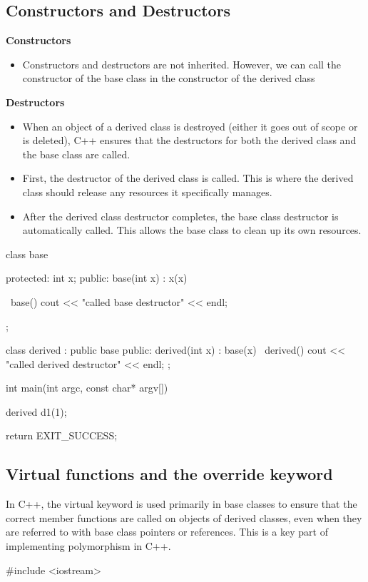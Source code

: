 \documentclass{report}
\begin{document}
\begin{concept}
    \pagebreak
    \subsection{Constructors and Destructors}
    \bigbreak \noindent 
    \begin{concept}
        \bigbreak \noindent 
        \textbf{Constructors}
    \begin{itemize}
       \item Constructors and destructors are not inherited. However, we can call the constructor of the base class in the constructor of the derived class
    \end{itemize} 
    \bigbreak \noindent 
    \textbf{Destructors}
    \begin{itemize}
        \item When an object of a derived class is destroyed (either it goes out of scope or is deleted), C++ ensures that the destructors for both the derived class and the base class are called.
        \item First, the destructor of the derived class is called. This is where the derived class should release any resources it specifically manages.
        \item After the derived class destructor completes, the base class destructor is automatically called. This allows the base class to clean up its own resources.
    \end{itemize}
    \end{concept}
    \bigbreak \noindent 
    \begin{cppcode}
        class base {
        protected:
            int x;
        public: 
            base(int x) : x(x) {}

            ~base() {
                cout << "called base destructor" << endl;
            }
        };

        class derived : public base {
        public: 
            derived(int x) : base(x) {}
            ~derived() {
                cout << "called derived destructor" << endl;
            }
        };

        int main(int argc, const char* argv[]) {

            derived d1(1);


            return EXIT_SUCCESS;
        }
    \end{cppcode}

    \pagebreak 
    \subsection{Virtual functions and the override keyword}
    \bigbreak \noindent 
    \begin{concept}
       In C++, the virtual keyword is used primarily in base classes to ensure that the correct member functions are called on objects of derived classes, even when they are referred to with base class pointers or references. This is a key part of implementing polymorphism in C++. 
    \end{concept}
    \bigbreak \noindent 
    \begin{cppcode}
#include <iostream>


\end{cppcode}
\end{concept}
\end{document}
